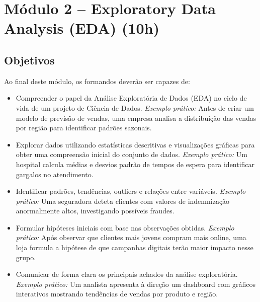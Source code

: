\section{\textcolor{sectionred}{Módulo 2 – Exploratory Data Analysis (EDA) (10h)}}

\subsection{\textcolor{subsectionblue}{Objetivos}}
Ao final deste módulo, os formandos deverão ser capazes de:
\begin{itemize}
  \item Compreender o papel da Análise Exploratória de Dados (EDA) no ciclo de vida de um projeto de Ciência de Dados.  
  \textit{Exemplo prático:} Antes de criar um modelo de previsão de vendas, uma empresa analisa a distribuição das vendas por região para identificar padrões sazonais.
  \item Explorar dados utilizando estatísticas descritivas e visualizações gráficas para obter uma compreensão inicial do conjunto de dados.  
  \textit{Exemplo prático:} Um hospital calcula médias e desvios padrão de tempos de espera para identificar gargalos no atendimento.
  \item Identificar padrões, tendências, outliers e relações entre variáveis.  
  \textit{Exemplo prático:} Uma seguradora deteta clientes com valores de indemnização anormalmente altos, investigando possíveis fraudes.
  \item Formular hipóteses iniciais com base nas observações obtidas.  
  \textit{Exemplo prático:} Após observar que clientes mais jovens compram mais online, uma loja formula a hipótese de que campanhas digitais terão maior impacto nesse grupo.
  \item Comunicar de forma clara os principais achados da análise exploratória.  
  \textit{Exemplo prático:} Um analista apresenta à direção um dashboard com gráficos interativos mostrando tendências de vendas por produto e região.
\end{itemize}


